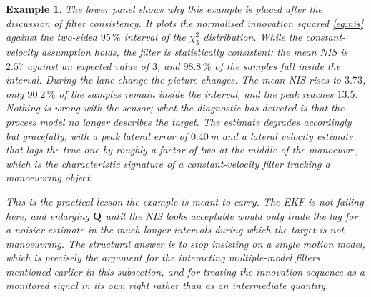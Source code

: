 \documentclass[11pt,oneside,openany]{book}
\newtheorem{example}{Example}[chapter]
\begin{document}
\begin{example}
The lower panel shows why this example is placed after the discussion of filter
consistency. It plots the normalised innovation squared \eqref{eq:nis} against
the two-sided $95\,\%$ interval of the $\chi^{2}_{3}$ distribution. While the
constant-velocity assumption holds, the filter is statistically consistent: the
mean NIS is $2.57$ against an expected value of $3$, and $98.8\,\%$ of the
samples fall inside the interval. During the lane change the picture changes.
The mean NIS rises to $3.73$, only $90.2\,\%$ of the samples remain inside the
interval, and the peak reaches $13.5$. Nothing is wrong with the sensor; what
the diagnostic has detected is that the process model no longer describes the
target. The estimate degrades accordingly but gracefully, with a peak lateral
error of $0.40$\,m and a lateral velocity estimate that lags the true one by
roughly a factor of two at the middle of the manoeuvre, which is the
characteristic signature of a constant-velocity filter tracking a manoeuvring
object.

This is the practical lesson the example is meant to carry. The EKF is not
failing here, and enlarging $\mathbf{Q}$ until the NIS looks acceptable would
only trade the lag for a noisier estimate in the much longer intervals during
which the target is not manoeuvring. The structural answer is to stop insisting
on a single motion model, which is precisely the argument for the interacting
multiple-model filters mentioned earlier in this subsection, and for treating
the innovation sequence as a monitored signal in its own right rather than as an
intermediate quantity.
\end{example}
\end{document}
